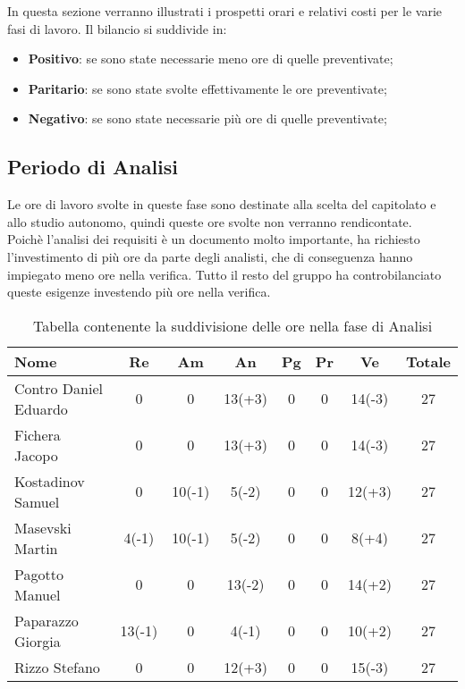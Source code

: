 \documentclass[../piano_di_progetto.tex]{subfiles}
\begin{document}
In questa sezione verranno illustrati i prospetti orari e relativi costi per le varie fasi di lavoro. Il bilancio si suddivide in:
\begin{itemize}
\item \textbf{Positivo}: se sono state necessarie meno ore di quelle preventivate;
\item \textbf{Paritario}: se sono state svolte effettivamente le ore preventivate;
\item \textbf{Negativo}: se sono state necessarie più ore di quelle preventivate;
\end{itemize}

\subsection{ Periodo di Analisi}%
\label{sub:cons_analisi}
Le ore di lavoro svolte in queste fase sono destinate alla scelta del capitolato e allo studio autonomo, quindi queste ore svolte non verranno rendicontate.\\
Poichè l'analisi dei requisiti è un documento molto importante, ha richiesto l'investimento di più ore da parte degli analisti, che di conseguenza hanno impiegato meno ore nella verifica. 
Tutto il resto del gruppo ha controbilanciato queste esigenze investendo più ore nella verifica.

\begin{table}[!ht]
	\centering
	\begin{tabular}{|l|c|c|c|c|c|c|c|}
	\hline
	\rowcolor{lightgray}
	\textbf{Nome} & \textbf{Re} & \textbf{Am} & \textbf{An} & \textbf{Pg}  & \textbf{Pr}   & \textbf{Ve} & \textbf{Totale}\\
	\hline
		Contro Daniel Eduardo & 0 & 0 & 13(+3) & 0 & 0 & 14(-3) & 27 \\
	\hline
		Fichera Jacopo & 0 & 0 & 13(+3) & 0 & 0 & 14(-3) & 27 \\
	\hline
		Kostadinov Samuel & 0 & 10(-1) & 5(-2) & 0 & 0 & 12(+3) & 27 \\			
	\hline
		Masevski Martin & 4(-1) & 10(-1) & 5(-2) & 0 & 0 & 8(+4) & 27 \\
	\hline
		Pagotto Manuel & 0 & 0 & 13(-2) & 0 & 0 & 14(+2) & 27 \\			
	\hline
		Paparazzo Giorgia & 13(-1) & 0 & 4(-1) & 0 & 0 & 10(+2) & 27 \\
	\hline
		Rizzo Stefano & 0 & 0 & 12(+3) & 0 & 0 & 15(-3) & 27 \\
	\hline	
	\end{tabular}
	\caption{Tabella contenente la suddivisione delle ore nella fase di Analisi}
\end{table}
\end{document}
